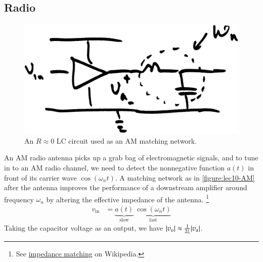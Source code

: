 \subsection{Radio}
\begin{figure}
  \centering
  \includegraphics[width=0.6\linewidth]{figures/10/AM}
  \caption{An \(R\approx 0\) LC circuit used as an AM matching network.}
  \label{figure:lec10-AM}
\end{figure}

An AM radio antenna picks up a grab bag of electromagnetic signals, and to tune in to an AM radio channel, we need to detect the nonnegative function \(a(t)\) in front of its carrier wave \(\cos(\omega_n t)\).
A matching network as in \autoref{figure:lec10-AM} after the antenna improves the performance of a downstream amplifier around frequency \(\omega_n\) by altering the effective impedance of the antenna.%
\footnote{See \href{https://en.wikipedia.org/wiki/Impedance_matching}{impedance matching} on Wikipedia.}
\begin{align}
  v_\text{in} &= \underbrace{a(t)}_{\text{slow}} \ \underbrace{\cos(\omega_n t)}_\text{fast}
\end{align}
Taking the capacitor voltage as an output, we have \(\abs{v_\text{o}} \approx \frac{1}{2\xi} \abs{v_\text{a}}\).

